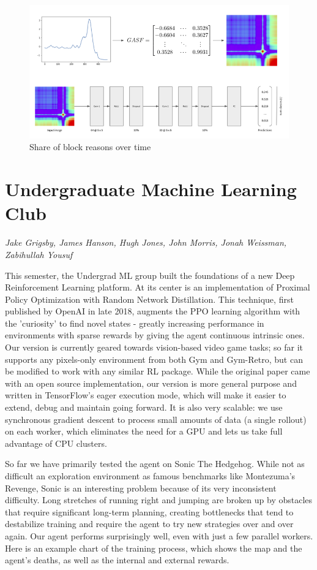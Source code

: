 \begin{figure}[!hbtp]
\includegraphics[width=\textwidth]{images/hm}
\caption{Share of block reasons over time}
\end{figure}

\pagebreak
\section{Undergraduate Machine Learning Club}
\label{sec:mlc}

\emph{Jake Grigsby, James Hanson, Hugh Jones, John Morris, Jonah Weissman, Zabihullah Yousuf}
\bigskip


This semester, the Undergrad ML group built the foundations of a new Deep Reinforcement Learning platform. At its center is an implementation of Proximal Policy Optimization with Random Network Distillation. This technique, first published by OpenAI in late 2018, augments the PPO learning algorithm with the 'curiosity' to find novel states - greatly increasing performance in environments with sparse rewards by giving the agent continuous intrinsic ones. Our version is currently geared towards vision-based video game tasks; so far it supports any pixels-only environment from both Gym and Gym-Retro, but can be modified to work with any similar RL package. While the original paper came with an open source implementation, our version is more general purpose and written in TensorFlow's eager execution mode, which will make it easier to extend, debug and maintain going forward. It is also very scalable: we use synchronous gradient descent to process small amounts of data (a single rollout) on each worker, which eliminates the need for a GPU and lets us take full advantage of CPU clusters.

So far we have primarily tested the agent on Sonic The Hedgehog. While not as difficult an exploration environment as famous benchmarks like Montezuma's Revenge, Sonic is an interesting problem because of its very inconsistent difficulty. Long stretches of running right and jumping are broken up by obstacles that require significant long-term planning, creating bottlenecks that tend to destabilize training and require the agent to try new strategies over and over again. Our agent performs surprisingly well, even with just a few parallel workers. Here is an example chart of the training process, which shows the map and the agent's deaths, as well as the internal and external rewards.

